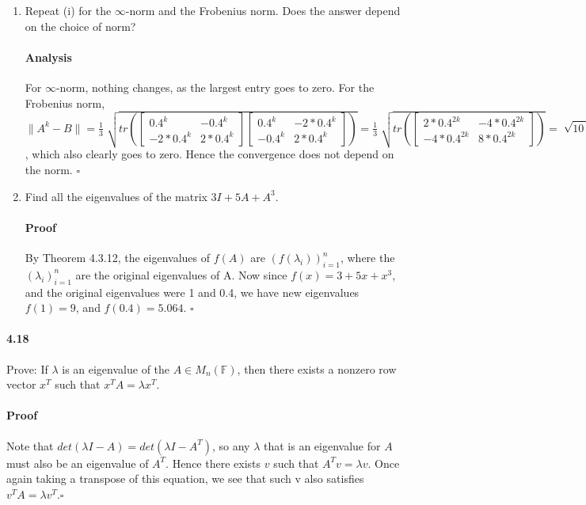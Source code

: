 \documentclass[letterpaper,12pt]{article}
\theoremstyle{definition}
\begin{document}
\begin{enumerate}[label=(\roman*)]
\item Repeat (i) for the $\infty$-norm and the Frobenius norm. Does the answer depend on the choice of norm? 



\paragraph{Analysis} For $\infty$-norm, nothing changes, as the largest entry goes to zero. 
For the Frobenius norm, 
$\|A^k - B\| =
\frac{1}{3}\sqrt[]{tr(
\begin{bmatrix}
0.4^k & - 0.4^k \\
-2* 0.4^k & 2*0.4^k
\end{bmatrix}
\begin{bmatrix}
0.4^k & - 2*0.4^k \\
- 0.4^k & 2*0.4^k
\end{bmatrix})}
=
\frac{1}{3}\sqrt[]{tr(
\begin{bmatrix}
2 *0.4^{2k} & - 4* 0.4^{2k} \\
-4 * 0.4^{2k} & 8*0.4^{2k}
\end{bmatrix})} = \sqrt[]{10 *0.4^{2k} }$, which also clearly goes to zero.
Hence the convergence does not depend on the norm.
$\square$
\item Find all the eigenvalues of the matrix $3I + 5A + A^3$.

\paragraph{Proof} By Theorem 4.3.12, the eigenvalues of $f(A)$ are $(f(\lambda_i))_{i = 1}^n$, where the $(\lambda_i)_{i = 1}^n$ are the original eigenvalues of A. Now since $f(x) = 3 + 5x + x^3$, and the original eigenvalues were 1 and 0.4, we have new eigenvalues $f(1) = 9$, and $f(0.4) = 5.064$.  $\square$
\end{enumerate}


\paragraph{4.18} Prove: If $\lambda$ is an eigenvalue of the $A \in M_n(\mathbb{F})$, then there exists a nonzero row vector $x^T$ such that $x^TA = \lambda x^T$.

\paragraph{Proof} Note that $det(\lambda I - A) = det( \lambda I - A^T)$, so any $\lambda$ that is an eigenvalue for $A$ must also be an eigenvalue of $A^T$. Hence there exists $v$ such that $A^T v = \lambda v$. Once again taking a transpose of this equation, we see that such v also satisfies $v^T A = \lambda v^T$.$\square$
\end{document}
